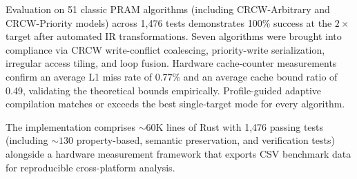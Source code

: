\documentclass[11pt]{article}
\begin{document}
Evaluation on 51 classic PRAM algorithms (including CRCW-Arbitrary and
CRCW-Priority models) across 1,476 tests demonstrates 100\% success at the
$2\times$ target after automated IR transformations.  Seven algorithms
were brought into compliance via CRCW write-conflict coalescing,
priority-write serialization, irregular access tiling, and loop fusion.
Hardware cache-counter measurements confirm an average L1 miss rate of 0.77\%
and an average cache bound ratio of 0.49, validating the theoretical bounds
empirically.  Profile-guided adaptive compilation matches or exceeds the best
single-target mode for every algorithm.

The implementation comprises ${\sim}60$K lines of Rust with 1,476
passing tests (including ${\sim}130$ property-based, semantic preservation,
and verification tests) alongside a hardware
measurement framework that exports CSV benchmark data for reproducible
cross-platform analysis.
\end{document}
